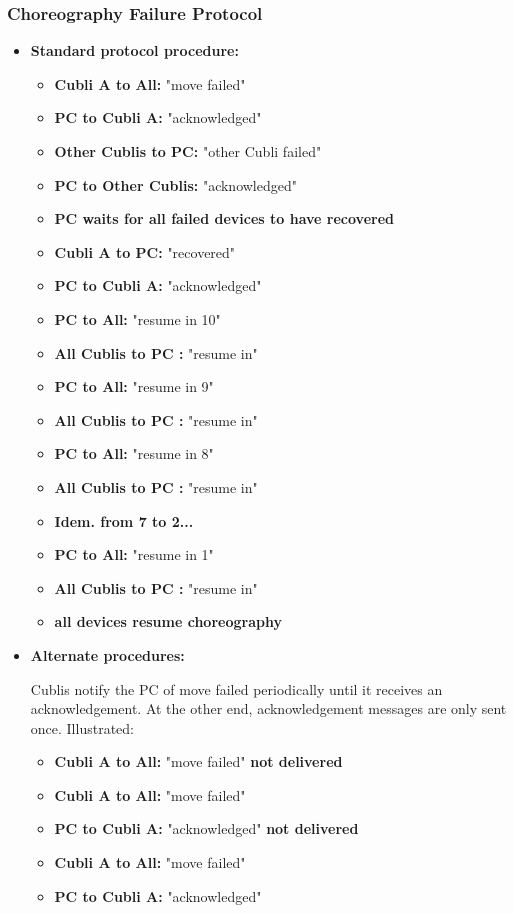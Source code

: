 \subsubsection{Choreography Failure Protocol}

\begin{itemize}
\item[] \textbf{Standard protocol procedure:}

\begin{itemize}
\item[] \textbf{Cubli A      to All:} "move failed"
\item[] \textbf{PC       to Cubli A:} "acknowledged"
\item[] \textbf{Other Cublis  to PC:} "other Cubli failed"
\item[] \textbf{PC  to Other Cublis:} "acknowledged"
\item[] \textbf{PC waits for all failed devices to have recovered}
\item[] \textbf{Cubli A       to PC:} "recovered"
\item[] \textbf{PC       to Cubli A:} "acknowledged"
\item[] \textbf{PC           to All:} "resume in 10"
\item[] \textbf{All Cublis   to PC :} "resume in"
\item[] \textbf{PC           to All:} "resume in  9"
\item[] \textbf{All Cublis   to PC :} "resume in"
\item[] \textbf{PC           to All:} "resume in  8"
\item[] \textbf{All Cublis   to PC :} "resume in"
\item[] \textbf{Idem. from 7 to 2...}
\item[] \textbf{PC           to All:} "resume in  1"
\item[] \textbf{All Cublis   to PC :} "resume in"
\item[] \textbf{all devices resume choreography}
\end{itemize}

\item[] \textbf{Alternate procedures:}

Cublis notify the PC of move failed periodically until it receives an acknowledgement. At the other end, acknowledgement messages are only sent once. Illustrated:

\begin{itemize}
\item[] \textbf{Cubli A      to All:} "move failed" \textbf{not delivered}
\item[] \textbf{Cubli A      to All:} "move failed"
\item[] \textbf{PC       to Cubli A:} "acknowledged" \textbf{not delivered}
\item[] \textbf{Cubli A      to All:} "move failed"
\item[] \textbf{PC       to Cubli A:} "acknowledged"
\end {itemize}


\end{itemize}
